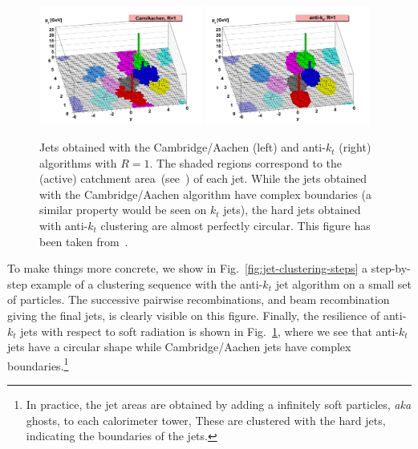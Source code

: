 \begin{figure}
  \centering
  \includegraphics[width=0.48\textwidth]{figures/event-root-active-cam.pdf}%
  \hfill%
  \includegraphics[width=0.48\textwidth]{figures/event-root-active-antikt.pdf}  
  \caption{Jets obtained with the Cambridge/Aachen (left) and
    anti-$k_t$ (right) algorithms with $R=1$. The shaded regions
    correspond to the (active) catchment
    area~(see~\cite{Cacciari:2008gn}) of each jet. While the jets
    obtained with the Cambridge/Aachen algorithm have complex
    boundaries (a similar property would be seen on $k_t$ jets), the
    hard jets obtained with anti-$k_t$ clustering are almost
    perfectly circular. This figure has been taken from~\cite{Cacciari:2008gp}.}\label{fig:jet-areas}
\end{figure}

To make things more concrete, we show in
Fig.~\ref{fig:jet-clustering-steps} a step-by-step example of a
clustering sequence with the anti-$k_t$ jet algorithm on a small set
of particles.
%
The successive pairwise recombinations, and beam recombination
giving the final jets, is clearly visible on this figure.
%
Finally, the resilience of anti-$k_t$ jets with respect to soft radiation is shown
in Fig.~\ref{fig:jet-areas}, where we see that anti-$k_t$ jets have a
circular shape while Cambridge/Aachen jets have complex
boundaries.\footnote{In practice, the jet areas are obtained by adding
  a infinitely soft particles, {\em aka} ghosts, to each calorimeter
  tower, These are clustered with the hard jets, indicating the
  boundaries of the jets.}

